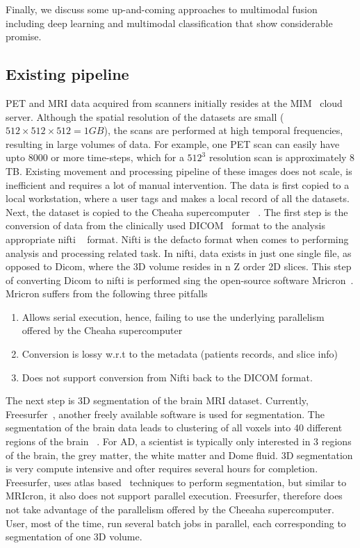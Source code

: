 \documentclass[11pt]{article}
\begin{document}
Finally, we discuss some up-and-coming approaches to multimodal fusion
including deep learning and multimodal classification that show considerable promise.


\subsection{Existing pipeline}
PET and MRI data acquired from scanners initially resides at the MIM~\cite{} cloud server. Although the spatial resolution of the datasets are small ($512 \times 512 \times 512 = 1 GB$), the scans are performed at high temporal frequencies, resulting in large volumes of data. For example, one PET scan can easily have upto 8000 or more time-steps, which for a $512^3$ resolution scan is approximately $8$ TB. Existing movement and processing pipeline of these images does not scale, is inefficient and requires a lot of manual intervention. The data is first copied to a local workstation, where a user tags and makes a local record of all the datasets. Next, the dataset is copied to the Cheaha supercomputer ~\cite{bibid}. The first step is the conversion of data from the clinically used DICOM~\cite{} format to the analysis appropriate nifti ~\cite{} format. Nifti is the defacto format when comes to performing analysis and processing related task. In nifti, data exists in just one single file, as opposed to Dicom, where the 3D volume resides in n Z order 2D slices. This step of converting Dicom to nifti is performed sing the open-source software Mricron~\cite{}. Mricron suffers from the following three pitfalls
\begin{enumerate}
	\setlength\itemsep{-0.2em}
	\item Allows serial execution, hence, failing to use the underlying parallelism offered by the Cheaha supercomputer
	\item Conversion is lossy w.r.t to the metadata (patients records, and slice info)
	\item Does not support conversion from Nifti back to the DICOM format.
\end{enumerate}

The next step is 3D segmentation of the brain MRI dataset. Currently, Freesurfer~\cite{}, another freely available software is used for segmentation. The segmentation of the brain data leads to clustering of all voxels into 40 different regions of the brain ~\cite{}. For AD, a scientist is typically only interested in 3 regions of the brain, the grey matter, the white matter and Dome fluid. 3D segmentation is very compute intensive and ofter requires several hours for completion. Freesurfer, uses atlas based~\cite{} techniques to perform segmentation, but similar to MRIcron, it also does not support parallel execution. Freesurfer, therefore does not take advantage of the parallelism offered by the Cheeaha supercomputer. User, most of the time, run several batch jobs in parallel, each corresponding to segmentation of one 3D volume.
\end{document}
